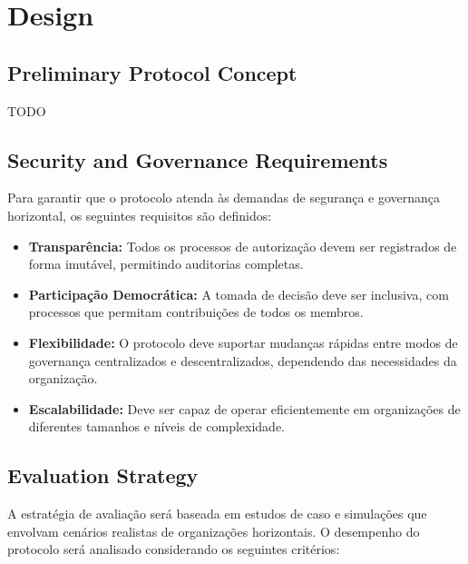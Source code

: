 
%

\chapter{Design}
\label{cha:design}

\glsresetall

\section{Preliminary Protocol Concept}
\label{sec:preliminary_protocol_concept}

TODO

\section{Security and Governance Requirements}
\label{sec:security_governance_requirements}

Para garantir que o protocolo atenda às demandas de segurança e
governança horizontal, os seguintes requisitos são definidos:

\begin{itemize}
    \item \textbf{Transparência:} Todos os processos de autorização
devem ser registrados de forma imutável, permitindo auditorias
completas.
    \item \textbf{Participação Democrática:} A tomada de decisão deve
ser inclusiva, com processos que permitam contribuições de todos os
membros.
    \item \textbf{Flexibilidade:} O protocolo deve suportar mudanças
rápidas entre modos de governança centralizados e descentralizados,
dependendo das necessidades da organização.
    \item \textbf{Escalabilidade:} Deve ser capaz de operar
eficientemente em organizações de diferentes tamanhos e níveis de
complexidade.
\end{itemize}

\section{Evaluation Strategy}
\label{sec:evaluation_strategy}

A estratégia de avaliação será baseada em estudos de caso e simulações
que envolvam cenários realistas de organizações horizontais. O
desempenho do protocolo será analisado considerando os seguintes
critérios:

